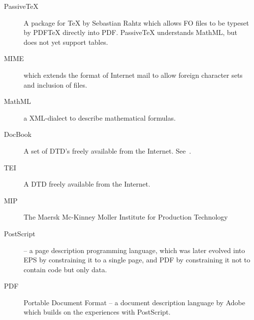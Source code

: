 \begin{description}
\item[PassiveTeX] A package for {\TeX} by Sebastian Rahtz which allows
  FO files to be typeset by PDF{\TeX} directly into PDF.  PassiveTeX
  understands MathML, but does not yet support tables.
  
\item[MIME]
   which extends the format of Internet
  mail to allow foreign character sets and inclusion of files.  
  

\item[MathML] a XML-dialect to describe mathematical formulas.


\item[DocBook] A set of DTD's freely available from the Internet.
  See~.
\item[TEI] A DTD freely available from the Internet.  
\item[MIP] The Maersk Mc-Kinney Moller Institute for Production Technology

\item[PostScript] -- a page description programming language, which
  was later evolved into EPS by constraining it to a single page, and
  PDF by constraining it not to contain code but only data.
  
\item[PDF] Portable Document Format -- a document description
  language by Adobe which builds on the experiences with PostScript.
\end{description}

  
    
